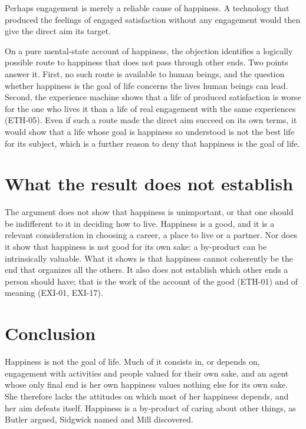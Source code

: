 \documentclass{situationist-preprint}
\begin{document}
\begin{objection}\label{o:causal}
Perhaps engagement is merely a reliable cause of happiness. A technology that produced the feelings of engaged satisfaction without any engagement would then give the direct aim its target.
\end{objection}

\begin{reply}
On a pure mental-state account of happiness, the objection identifies a logically possible route to happiness that does not pass through other ends. Two points answer it. First, no such route is available to human beings, and the question whether happiness is the goal of life concerns the lives human beings can lead. Second, the experience machine shows that a life of produced satisfaction is worse for the one who lives it than a life of real engagement with the same experiences (ETH-05). Even if such a route made the direct aim succeed on its own terms, it would show that a life whose goal is happiness so understood is not the best life for its subject, which is a further reason to deny that happiness is the goal of life.
\end{reply}

\section{What the result does not establish}

The argument does not show that happiness is unimportant, or that one should be indifferent to it in deciding how to live. Happiness is a good, and it is a relevant consideration in choosing a career, a place to live or a partner. Nor does it show that happiness is not good for its own sake: a by-product can be intrinsically valuable. What it shows is that happiness cannot coherently be the end that organizes all the others. It also does not establish which other ends a person should have; that is the work of the account of the good (ETH-01) and of meaning (EXI-01, EXI-17).

\section{Conclusion}

Happiness is not the goal of life. Much of it consists in, or depends on, engagement with activities and people valued for their own sake, and an agent whose only final end is her own happiness values nothing else for its own sake. She therefore lacks the attitudes on which most of her happiness depends, and her aim defeats itself. Happiness is a by-product of caring about other things, as Butler argued, Sidgwick named and Mill discovered.
\end{document}

